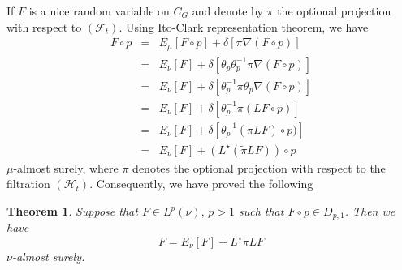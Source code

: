 \documentclass[12pt,a4paper]{book}
\newtheorem{theorem}{Theorem}[section]
\newcommand{\F}{{\mathcal F}}
\renewcommand{\H}{{\mathcal H}}
\begin{document}
If $F$ is a nice random variable on $C_G$ and denote by $\pi$ the
optional projection with respect to $(\F_t)$. Using Ito-Clark
representation theorem,
  we have
\begin{eqnarray*}
F\circ p &=& E_\mu[F\circ p]+\delta\left[\pi\nabla(F\circ p)\right]\\
      &=& E_\nu[F]+\delta\left[\theta_p\theta_p^{-1}\pi\nabla(F\circ
        p)\right]\\
    &=& E_\nu[F]+\delta\left[\theta_p^{-1}\pi\theta_p \nabla(F\circ p)\right]\\
    &=& E_\nu[F]+\delta\left[\theta_p^{-1}\pi(LF\circ p)\right]\\
    &=& E_\nu[F]+\delta\left[\theta_p^{-1}({\tilde{\pi}} LF)\circ p)\right]\\
     &=& E_\nu[F]+(L^\star({\tilde{\pi}}LF))\circ p
\end{eqnarray*}
$\mu$-almost surely, where $\tilde{\pi}$ denotes the optional projection
with respect to the filtration $(\H_t)$. Consequently, we have proved the
following
\begin{theorem}
Suppose that $F\in L^p(\nu),\,p>1$ such that $F\circ p\in D_{p,1}$. Then
we have
$$
F=E_\nu[F]+L^\star{\tilde{\pi}}LF
$$
$\nu$-almost surely.
\end{theorem}
\end{document}
